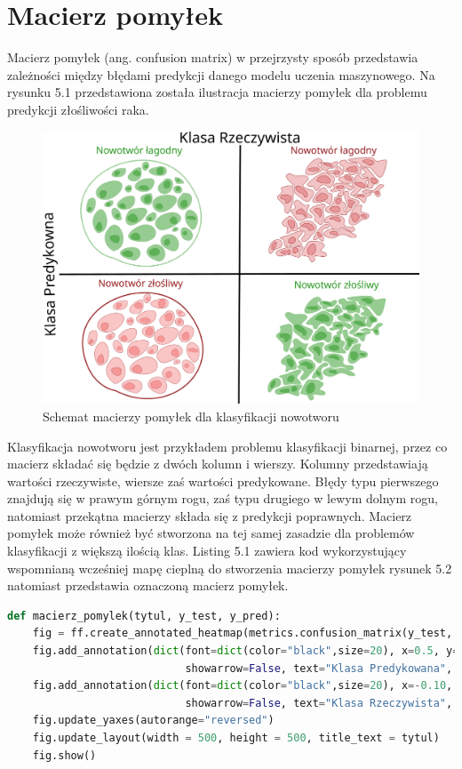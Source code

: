 \documentclass[a4paper,12pt,oneside]{book}
\begin{document}
\section{Macierz pomyłek}
Macierz pomyłek (ang. confusion matrix) w przejrzysty sposób przedstawia zależności między błędami predykcji danego modelu uczenia maszynowego. Na rysunku 5.1 przedstawiona została ilustracja macierzy pomyłek dla problemu predykcji złośliwości raka.

\begin{figure}[H]
\centering
\includegraphics[scale=0.5]{confMat.png}
\caption{Schemat macierzy pomyłek dla klasyfikacji nowotworu}
\end{figure}

Klasyfikacja nowotworu jest przykładem problemu klasyfikacji binarnej, przez co macierz składać się będzie z dwóch kolumn i wierszy. Kolumny przedstawiają wartości rzeczywiste, wiersze zaś wartości predykowane. Błędy typu pierwszego znajdują się w prawym górnym rogu, zaś typu drugiego w lewym dolnym rogu, natomiast przekątna macierzy składa się z predykcji poprawnych. Macierz pomyłek może również być stworzona na tej samej zasadzie dla problemów klasyfikacji z większą ilością klas. Listing 5.1 zawiera kod wykorzystujący wspomnianą wcześniej mapę cieplną do stworzenia macierzy pomyłek rysunek 5.2 natomiast przedstawia oznaczoną macierz pomyłek.


\begin{lstlisting}[language=Python, caption=Funkcja tworząca macierz pomyłek]
def macierz_pomylek(tytul, y_test, y_pred):
    fig = ff.create_annotated_heatmap(metrics.confusion_matrix(y_test, y_pred), colorscale='Greens')
    fig.add_annotation(dict(font=dict(color="black",size=20), x=0.5, y=1.10,
                            showarrow=False, text="Klasa Predykowana", xref="paper", yref="paper"))
    fig.add_annotation(dict(font=dict(color="black",size=20), x=-0.10, y=0.5,
                            showarrow=False, text="Klasa Rzeczywista", textangle=-90, xref="paper", yref="paper"))
    fig.update_yaxes(autorange="reversed")
    fig.update_layout(width = 500, height = 500, title_text = tytul)
    fig.show()
\end{lstlisting}
\end{document}
